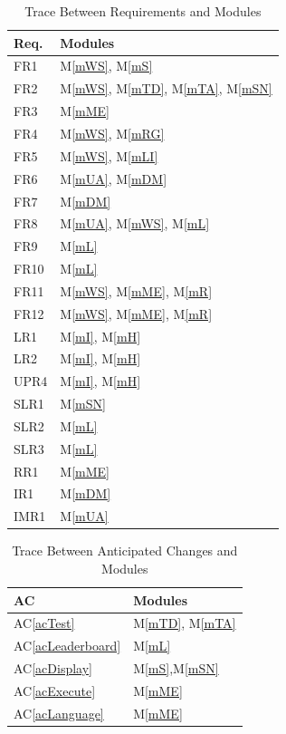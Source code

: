 \documentclass[12pt, titlepage]{article}
\newcommand{\acref}[1]{AC\ref{#1}}
\newcommand{\mref}[1]{M\ref{#1}}
\begin{document}
\begin{table}[H]
\centering
\begin{tabular}{p{} p{}}
\toprule
\textbf{Req.} & \textbf{Modules}\\
\midrule
FR1 & \mref{mWS}, \mref{mS}\\
FR2 & \mref{mWS}, \mref{mTD}, \mref{mTA}, \mref{mSN}\\
FR3 & \mref{mME}\\
FR4 & \mref{mWS}, \mref{mRG}\\
FR5 & \mref{mWS}, \mref{mLI}\\
FR6 & \mref{mUA}, \mref{mDM}\\
FR7 & \mref{mDM}\\
FR8 & \mref{mUA}, \mref{mWS}, \mref{mL}\\
FR9 & \mref{mL}\\
FR10 & \mref{mL}\\
FR11 & \mref{mWS}, \mref{mME}, \mref{mR}\\
FR12 & \mref{mWS}, \mref{mME}, \mref{mR}\\
LR1 & \mref{mI}, \mref{mH} \\
LR2 & \mref{mI}, \mref{mH}\\
UPR4 & \mref{mI}, \mref{mH}\\
SLR1 & \mref{mSN}\\
SLR2 & \mref{mL}\\
SLR3 & \mref{mL}\\
RR1 & \mref{mME}\\
IR1 & \mref{mDM}\\
IMR1 & \mref{mUA}\\
\bottomrule
\end{tabular}
\caption{Trace Between Requirements and Modules}
\label{TblRT}
\end{table}

\begin{table}[H]
\centering
\begin{tabular}{p{} p{}}
\toprule
\textbf{AC} & \textbf{Modules}\\
\midrule
\acref{acTest} & \mref{mTD}, \mref{mTA}\\
\acref{acLeaderboard} & \mref{mL}\\
\acref{acDisplay} & \mref{mS},\mref{mSN}\\
\acref{acExecute} & \mref{mME}\\
\acref{acLanguage} & \mref{mME}\\
\bottomrule
\end{tabular}
\caption{Trace Between Anticipated Changes and Modules}
\label{TblACT}
\end{table}
\end{document}
